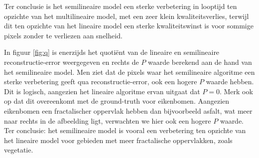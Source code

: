 \documentclass[12pt]{report}
\begin{document}
Ter conclusie is het semilineaire model een sterke verbetering in looptijd ten opzichte van het multilineaire model, met een zeer klein kwaliteitsverlies, terwijl dit ten opzichte van het lineaire model een sterke kwaliteitswinst is voor sommige pixels zonder te verliezen aan snelheid.

In figuur \ref{fig:q} is enerzijds het quoti\"ent van de lineaire en semilineaire reconstructie-error weergegeven en rechts de $P$ waarde berekend aan de hand van het semilineaire model. Men ziet dat de pixels waar het semilineaire algoritme een sterke verbetering geeft qua reconstructie-error, ook een hogere $P$ waarde hebben. Dit is logisch, aangezien het lineaire algoritme ervan uitgaat dat $P=0$. Merk ook op dat dit overeenkomt met de ground-truth voor eikenbomen. Aangezien eikenbomen een fractalischer oppervlak hebben dan bijvoorbeeld asfalt, wat meer naar rechts in de afbeelding ligt, verwachten we hier ook een hogere $P$ waarde. Ter conclusie: het semilineaire model is vooral een verbetering ten opzichte van het lineaire model voor gebieden met meer fractalische oppervlakken, zoals vegetatie.
\end{document}
